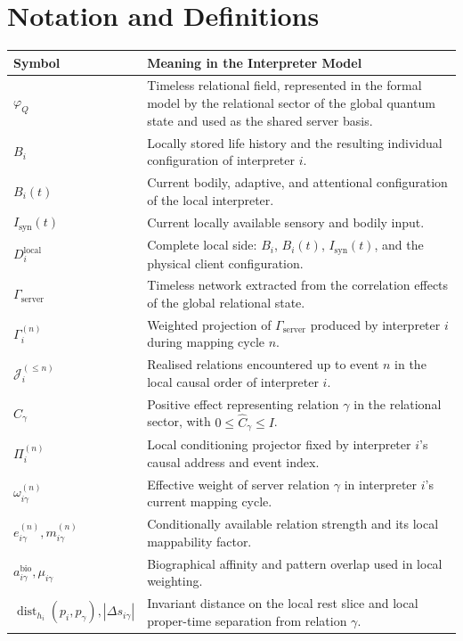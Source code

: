 \section{Notation and Definitions}
\label{app:notation}

\begin{table}[H]
\centering
\scriptsize
\renewcommand{\arraystretch}{0.90}
\begin{tabular}{p{3.0cm}p{9.8cm}}
\toprule
Symbol & Meaning in the Interpreter Model \\
\midrule
$\varphi_Q$ & Timeless relational field, represented in the formal model by the relational sector of the global quantum state and used as the shared server basis. \\
$B_i$ & Locally stored life history and the resulting individual configuration of interpreter $i$. \\
$B_i(t)$ & Current bodily, adaptive, and attentional configuration of the local interpreter. \\
$I_{\mathrm{syn}}(t)$ & Current locally available sensory and bodily input. \\
$D_i^{\mathrm{local}}$ & Complete local side: $B_i$, $B_i(t)$, $I_{\mathrm{syn}}(t)$, and the physical client configuration. \\
$\Gamma_{\mathrm{server}}$ & Timeless network extracted from the correlation effects of the global relational state. \\
$\Gamma_i^{(n)}$ & Weighted projection of $\Gamma_{\mathrm{server}}$ produced by interpreter $i$ during mapping cycle $n$. \\
$\mathcal J_i^{(\leq n)}$ & Realised relations encountered up to event $n$ in the local causal order of interpreter $i$. \\
$\hat C_\gamma$ & Positive effect representing relation $\gamma$ in the relational sector, with $0\leq\hat C_\gamma\leq I$. \\
$\Pi_i^{(n)}$ & Local conditioning projector fixed by interpreter $i$'s causal address and event index. \\
$\omega_{i\gamma}^{(n)}$ & Effective weight of server relation $\gamma$ in interpreter $i$'s current mapping cycle. \\
$e_{i\gamma}^{(n)},m_{i\gamma}^{(n)}$ & Conditionally available relation strength and its local mappability factor. \\
$a_{i\gamma}^{\mathrm{bio}},\mu_{i\gamma}$ & Biographical affinity and pattern overlap used in local weighting. \\
$\operatorname{dist}_{h_i}(p_i,p_\gamma),|\Delta s_{i\gamma}|$ & Invariant distance on the local rest slice and local proper-time separation from relation $\gamma$. \\

\end{tabular}
\end{table}
